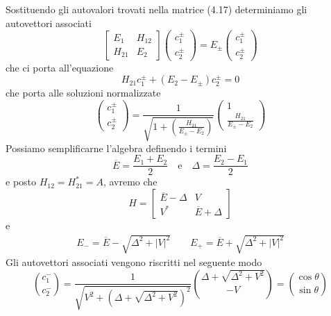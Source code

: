 Sostituendo gli autovalori trovati nella matrice (4.17) determiniamo gli autovettori associati
\begin{equation*}
		\left [ \begin{array}{cc} 
		E_{1} & H_{12} \\ H_{21} & E_{2}
	\end{array}\right ]\left( \begin{array}{c} c_1^{\pm} \\ c_2^{\pm} \end{array}\right) = E_{\pm} \left ( \begin{array}{c} c_1^{\pm} \\ c_2^{\pm} \end{array}\right) 
\end{equation*}
che ci porta all'equazione
\begin{equation*}
	H_{21}c_{1}^{\pm} +(E_2-E_{\pm})c_{2}^{\pm} = 0
\end{equation*}
che porta alle soluzioni normalizzate 
\begin{equation*}
	\left( \begin{array}{c} c_1^{\pm} \\ c_2^{\pm} \end{array}\right) = \frac{1}{\sqrt{1 + \left ( \frac{H_{21}}{E_{\pm} - E_2}\right)}}\left( \begin{array}{c} 1 \\ \frac{H_{21}}{E_{\pm} - E_2} \end{array}\right)
\end{equation*}
Possiamo semplificarne l'algebra definendo i termini 
\begin{equation*}
	\overline{E} = \frac{E_1 + E_2}{2} \quad \text{e} \quad \Delta  = \frac{E_2 - E_1}{2}
\end{equation*}
e posto $H_{12} = H_{21}^* = A$, avremo che 
\begin{equation*}
	\hat{H} = \left [ \begin{array}{cc}
		\overline{E} - \Delta & V \\ V^* & \overline{E}+ \Delta 
	\end{array}\right ] 
\end{equation*}
e
\begin{align*}
	E_- = \overline{E} - \sqrt{\Delta^2 + |V|^2} \quad \quad 	E_+ = \overline{E} + \sqrt{\Delta^2 + |V|^2}
\end{align*}
\newpage
Gli autovettori associati vengono riscritti nel seguente modo 
\begin{equation*}
	\binom{c_1^{-}}{c_2^{-}}=\frac{1}{\sqrt{V^2+\left(\Delta+\sqrt{\Delta^2+V^2}\right)^2}}\binom{\Delta+\sqrt{\Delta^2+V^2}}{-V}=\binom{\cos \theta}{\sin \theta}
\end{equation*}
